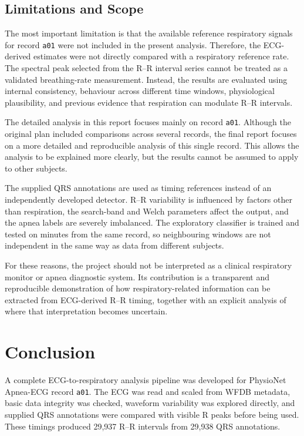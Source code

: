 \documentclass[a4paper,10.5pt,oneside]{report}
\begin{document}
\section{Limitations and Scope}

The most important limitation is that the available reference respiratory signals for record \texttt{a01} were not included in the present analysis. Therefore, the ECG-derived estimates were not directly compared with a respiratory reference rate. The spectral peak selected from the R--R interval series cannot be treated as a validated breathing-rate measurement. Instead, the results are evaluated using internal consistency, behaviour across different time windows, physiological plausibility, and previous evidence that respiration can modulate R--R intervals.

The detailed analysis in this report focuses mainly on record \texttt{a01}. Although the original plan included comparisons across several records, the final report focuses on a more detailed and reproducible analysis of this single record. This allows the analysis to be explained more clearly, but the results cannot be assumed to apply to other subjects.

The supplied QRS annotations are used as timing references instead of an
independently developed detector. R--R variability is influenced by factors
other than respiration, the search-band and Welch parameters affect the output,
and the apnea labels are severely imbalanced. The exploratory classifier is
trained and tested on minutes from the same record, so neighbouring windows are
not independent in the same way as data from different subjects.

For these reasons, the project should not be interpreted as a clinical
respiratory monitor or apnea diagnostic system. Its contribution is a
transparent and reproducible demonstration of how respiratory-related
information can be extracted from ECG-derived R--R timing, together with an
explicit analysis of where that interpretation becomes uncertain.

\chapter{Conclusion}

A complete ECG-to-respiratory analysis pipeline was developed for PhysioNet
Apnea-ECG record \texttt{a01}. The ECG was read and scaled from WFDB metadata,
basic data integrity was checked, waveform variability was explored directly,
and supplied QRS annotations were compared with visible R peaks before being
used. These timings produced 29,937 R--R intervals from 29,938 QRS annotations.
\end{document}
